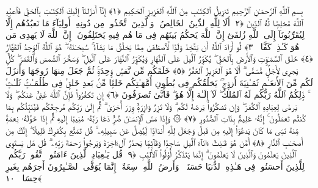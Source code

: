 
  
    
  
    
    

\nopagebreak
  بِسمِ ٱللَّهِ ٱلرَّحمَـٰنِ ٱلرَّحِيمِ
  تَنزِيلُ ٱلكِتَـٰبِ مِنَ ٱللَّهِ ٱلعَزِيزِ ٱلحَكِيمِ ﴿١﴾
 إِنَّآ أَنزَلنَآ إِلَيكَ ٱلكِتَـٰبَ بِٱلحَقِّ فَٱعبُدِ ٱللَّهَ مُخلِصًۭا لَّهُ ٱلدِّينَ ﴿٢﴾
 أَلَا لِلَّهِ ٱلدِّينُ ٱلخَالِصُ ۚ وَٱلَّذِينَ ٱتَّخَذُوا۟ مِن دُونِهِۦٓ أَولِيَآءَ مَا نَعبُدُهُم إِلَّا لِيُقَرِّبُونَآ إِلَى ٱللَّهِ زُلفَىٰٓ إِنَّ ٱللَّهَ يَحكُمُ بَينَهُم فِى مَا هُم فِيهِ يَختَلِفُونَ ۗ إِنَّ ٱللَّهَ لَا يَهدِى مَن هُوَ كَـٰذِبٌۭ كَفَّارٌۭ ﴿٣﴾
 لَّو أَرَادَ ٱللَّهُ أَن يَتَّخِذَ وَلَدًۭا لَّٱصطَفَىٰ مِمَّا يَخلُقُ مَا يَشَآءُ ۚ سُبحَـٰنَهُۥ ۖ هُوَ ٱللَّهُ ٱلوَٟحِدُ ٱلقَهَّارُ ﴿٤﴾
 خَلَقَ ٱلسَّمَـٰوَٟتِ وَٱلأَرضَ بِٱلحَقِّ ۖ يُكَوِّرُ ٱلَّيلَ عَلَى ٱلنَّهَارِ وَيُكَوِّرُ ٱلنَّهَارَ عَلَى ٱلَّيلِ ۖ وَسَخَّرَ ٱلشَّمسَ وَٱلقَمَرَ ۖ كُلٌّۭ يَجرِى لِأَجَلٍۢ مُّسَمًّى ۗ أَلَا هُوَ ٱلعَزِيزُ ٱلغَفَّٰرُ ﴿٥﴾
 خَلَقَكُم مِّن نَّفسٍۢ وَٟحِدَةٍۢ ثُمَّ جَعَلَ مِنهَا زَوجَهَا وَأَنزَلَ لَكُم مِّنَ ٱلأَنعَـٰمِ ثَمَـٰنِيَةَ أَزوَٟجٍۢ ۚ يَخلُقُكُم فِى بُطُونِ أُمَّهَـٰتِكُم خَلقًۭا مِّنۢ بَعدِ خَلقٍۢ فِى ظُلُمَـٰتٍۢ ثَلَـٰثٍۢ ۚ ذَٟلِكُمُ ٱللَّهُ رَبُّكُم لَهُ ٱلمُلكُ ۖ لَآ إِلَـٰهَ إِلَّا هُوَ ۖ فَأَنَّىٰ تُصرَفُونَ ﴿٦﴾
 إِن تَكفُرُوا۟ فَإِنَّ ٱللَّهَ غَنِىٌّ عَنكُم ۖ وَلَا يَرضَىٰ لِعِبَادِهِ ٱلكُفرَ ۖ وَإِن تَشكُرُوا۟ يَرضَهُ لَكُم ۗ وَلَا تَزِرُ وَازِرَةٌۭ وِزرَ أُخرَىٰ ۗ ثُمَّ إِلَىٰ رَبِّكُم مَّرجِعُكُم فَيُنَبِّئُكُم بِمَا كُنتُم تَعمَلُونَ ۚ إِنَّهُۥ عَلِيمٌۢ بِذَاتِ ٱلصُّدُورِ ﴿٧﴾
 ۞ وَإِذَا مَسَّ ٱلإِنسَـٰنَ ضُرٌّۭ دَعَا رَبَّهُۥ مُنِيبًا إِلَيهِ ثُمَّ إِذَا خَوَّلَهُۥ نِعمَةًۭ مِّنهُ نَسِىَ مَا كَانَ يَدعُوٓا۟ إِلَيهِ مِن قَبلُ وَجَعَلَ لِلَّهِ أَندَادًۭا لِّيُضِلَّ عَن سَبِيلِهِۦ ۚ قُل تَمَتَّع بِكُفرِكَ قَلِيلًا ۖ إِنَّكَ مِن أَصحَـٰبِ ٱلنَّارِ ﴿٨﴾
 أَمَّن هُوَ قَـٰنِتٌ ءَانَآءَ ٱلَّيلِ سَاجِدًۭا وَقَآئِمًۭا يَحذَرُ ٱلءَاخِرَةَ وَيَرجُوا۟ رَحمَةَ رَبِّهِۦ ۗ قُل هَل يَستَوِى ٱلَّذِينَ يَعلَمُونَ وَٱلَّذِينَ لَا يَعلَمُونَ ۗ إِنَّمَا يَتَذَكَّرُ أُو۟لُوا۟ ٱلأَلبَٰبِ ﴿٩﴾
 قُل يَـٰعِبَادِ ٱلَّذِينَ ءَامَنُوا۟ ٱتَّقُوا۟ رَبَّكُم ۚ لِلَّذِينَ أَحسَنُوا۟ فِى هَـٰذِهِ ٱلدُّنيَا حَسَنَةٌۭ ۗ وَأَرضُ ٱللَّهِ وَٟسِعَةٌ ۗ إِنَّمَا يُوَفَّى ٱلصَّـٰبِرُونَ أَجرَهُم بِغَيرِ حِسَابٍۢ ﴿١٠﴾
